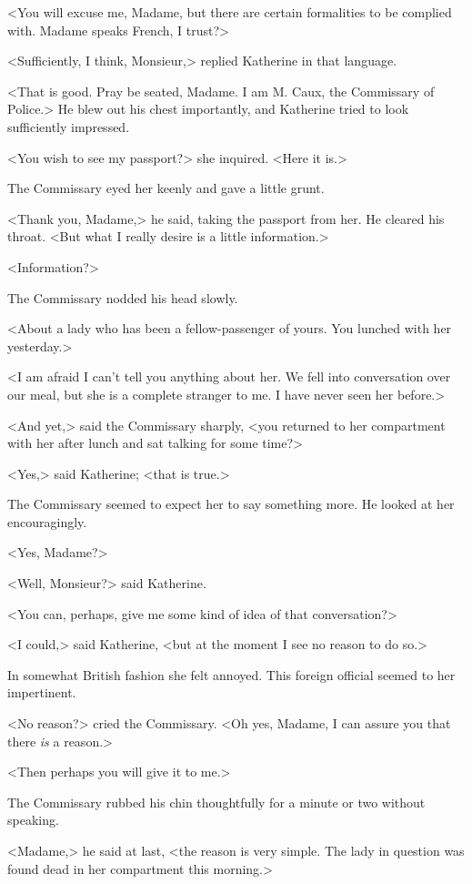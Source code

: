<You will excuse me, Madame, but there are certain formalities to be complied with. Madame speaks French, I trust?>

<Sufficiently, I think, Monsieur,> replied Katherine in that language.

<That is good. Pray be seated, Madame. I am M. Caux, the Commissary of Police.> He blew out his chest importantly, and Katherine tried to look sufficiently impressed.

<You wish to see my passport?> she inquired. <Here it is.>

The Commissary eyed her keenly and gave a little grunt.

<Thank you, Madame,> he said, taking the passport from her. He cleared his throat. <But what I really desire is a little information.>

<Information?>

The Commissary nodded his head slowly.

<About a lady who has been a fellow-passenger of yours. You lunched with her yesterday.>

<I am afraid I can't tell you anything about her. We fell into conversation over our meal, but she is a complete stranger to me. I have never seen her before.>

<And yet,> said the Commissary sharply, <you returned to her compartment with her after lunch and sat talking for some time?>

<Yes,> said Katherine; <that is true.>

The Commissary seemed to expect her to say something more. He looked at her encouragingly.

<Yes, Madame?>

<Well, Monsieur?> said Katherine.

<You can, perhaps, give me some kind of idea of that conversation?>

<I could,> said Katherine, <but at the moment I see no reason to do so.>

In somewhat British fashion she felt annoyed. This foreign official seemed to her impertinent.

<No reason?> cried the Commissary. <Oh yes, Madame, I can assure you that there \emph{is} a reason.>

<Then perhaps you will give it to me.>

The Commissary rubbed his chin thoughtfully for a minute or two without speaking.

<Madame,> he said at last, <the reason is very simple. The lady in question was found dead in her compartment this morning.>

